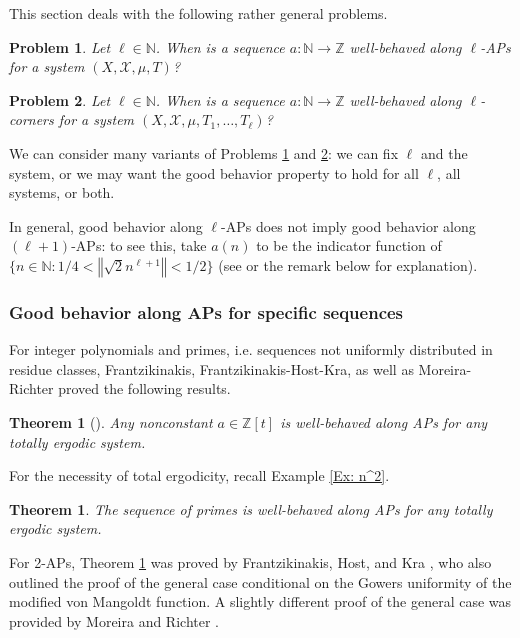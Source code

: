 \documentclass[11pt]{amsart}
\newtheorem{theorem}[lemma]{Theorem}
\newtheorem{problem}{Problem}
\theoremstyle{definition}
\DeclareMathOperator*{\E}{\mathbb{E}}
\newcommand{\N}{{\mathbb N}}
\newcommand{\Z}{{\mathbb Z}}
\newcommand{\CX}{{\mathcal X}}
\newcommand{\norm}[1]{\left\Vert #1\right\Vert}
\newcommand{\1}{{\mathbf{1}}}
\begin{document}
This section  deals with the following rather general problems.
\begin{problem}\label{Pr: identity along APs}
    Let $\ell\in\N$. When is a sequence $a:\N\to\Z$ well-behaved along $\ell$-APs for a system $(X,\CX,\mu,T)$?
\end{problem}
\begin{problem}\label{Pr: identity along corners}
Let $\ell\in\N$. When is a sequence $a:\N\to\Z$ well-behaved along $\ell$-corners for a system $(X,\CX,\mu,T_1, \ldots, T_\ell)$?
\end{problem}
We can consider many variants of Problems \ref{Pr: identity along APs} and \ref{Pr: identity along corners}: we can fix $\ell$ and the system, or we may want the good behavior property to hold for all $\ell$, all systems, or both.

In general, good behavior along $\ell$-APs does not imply good behavior along $(\ell+1)$-APs: to see this, take $a(n)$ to be the indicator function of $\{n\in\N\colon 1/4<\norm{\sqrt{2}n^{\ell+1}}<1/2\}$ (see \cite[Theorem A]{FLW06} or the remark below \cite[Theorem 3.4]{FrKu22c} for explanation).

\subsubsection{Good behavior along APs for specific sequences}
For integer polynomials and primes, i.e. sequences not uniformly distributed in residue classes, Frantzikinakis, Frantzikinakis-Host-Kra, as well as Moreira-Richter proved the following results.
\begin{theorem}[{\cite[Theorem A]{Fr08}}]\label{T: Fr polys along APs}
    Any nonconstant $a\in\Z[t]$ is well-behaved along APs for any totally ergodic system.
\end{theorem}
For the necessity of total ergodicity, recall Example \ref{Ex: n^2}.
\begin{theorem}\label{T: primes along APs}
    The sequence of primes is well-behaved along APs for any totally ergodic system.
\end{theorem}
For 2-APs, Theorem \ref{T: primes along APs} was proved by Frantzikinakis, Host, and Kra \cite[Theorem 5]{FHK07}, who also outlined the proof of the general case conditional on the Gowers uniformity of the modified von Mangoldt function. A slightly different proof of the general case was provided by Moreira and Richter \cite[Theorem 2.9]{MR19}.
\end{document}
